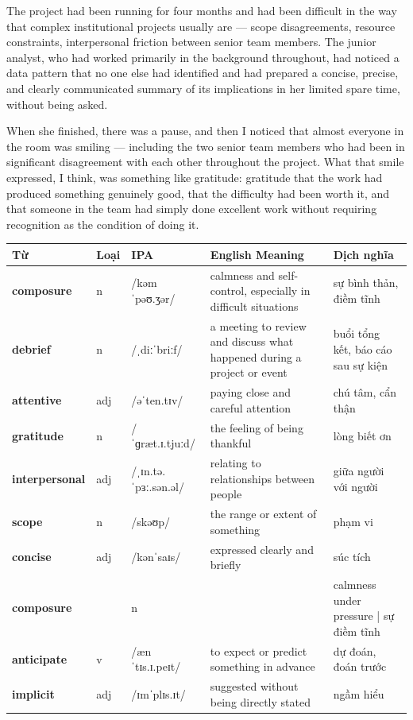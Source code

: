 \begin{ieltsanswer}
The project had been running for four months and had been difficult in the way that complex institutional projects usually are — scope disagreements, resource constraints, interpersonal friction between senior team members. The junior analyst, who had worked primarily in the background throughout, had noticed a data pattern that no one else had identified and had prepared a concise, precise, and clearly communicated summary of its implications in her limited spare time, without being asked.

When she finished, there was a pause, and then I noticed that almost everyone in the room was smiling — including the two senior team members who had been in significant disagreement with each other throughout the project. What that smile expressed, I think, was something like gratitude: gratitude that the work had produced something genuinely good, that the difficulty had been worth it, and that someone in the team had simply done excellent work without requiring recognition as the condition of doing it.
\end{ieltsanswer}


\vspace{0.8em}
\begin{center}
\renewcommand{\arraystretch}{1.65}
\begin{tabularx}{\textwidth}{|V{0.22\textwidth}|C{0.07\textwidth}|I{0.20\textwidth}|Y|V{0.18\textwidth}|}
\hline
{}
\textbf{Từ} & \textbf{Loại} & \textbf{IPA} & \textbf{English Meaning} & \textbf{Dịch nghĩa} \\
\hline
\textbf{composure} & n & /kəmˈpəʊ.ʒər/ & calmness and self-control, especially in difficult situations & sự bình thản, điềm tĩnh \\ \hline
\textbf{debrief} & n & /ˌdiːˈbriːf/ & a meeting to review and discuss what happened during a project or event & buổi tổng kết, báo cáo sau sự kiện \\ \hline
\textbf{attentive} & adj & /əˈten.tɪv/ & paying close and careful attention & chú tâm, cẩn thận \\ \hline
\textbf{gratitude} & n & /ˈɡræt.ɪ.tjuːd/ & the feeling of being thankful & lòng biết ơn \\ \hline
\textbf{interpersonal} & adj & /ˌɪn.tə.ˈpɜː.sən.əl/ & relating to relationships between people & giữa người với người \\ \hline
\textbf{scope} & n & /skəʊp/ & the range or extent of something & phạm vi \\ \hline
\textbf{concise} & adj & /kənˈsaɪs/ & expressed clearly and briefly & súc tích \\ \hline
\textbf{composure} & & n & & calmness under pressure | sự điềm tĩnh \\ \hline
\textbf{anticipate} & v & /ænˈtɪs.ɪ.peɪt/ & to expect or predict something in advance & dự đoán, đoán trước \\ \hline
\textbf{implicit} & adj & /ɪmˈplɪs.ɪt/ & suggested without being directly stated & ngầm hiểu \\ \hline
\end{tabularx}
\end{center}

